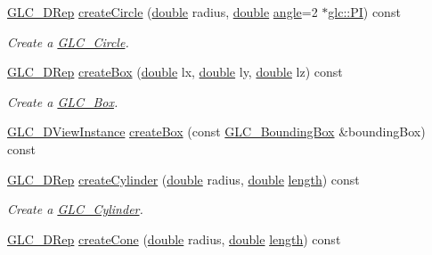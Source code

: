 \begin{DoxyCompactItemize}
\hyperlink{class_g_l_c__3_d_rep}{G\-L\-C\-\_\-D\-Rep} \hyperlink{class_g_l_c___factory_ace93470a718f80b8282987f3784ec05d}{create\-Circle} (\hyperlink{_super_l_u_support_8h_a8956b2b9f49bf918deed98379d159ca7}{double} radius, \hyperlink{_super_l_u_support_8h_a8956b2b9f49bf918deed98379d159ca7}{double} \hyperlink{glext_8h_a9e06c1f76a20fed54ca742cd25cb02c4}{angle}=2 $\ast$\hyperlink{namespaceglc_ad0f268df7555a0084f6f242e599a0572}{glc\-::\-P\-I}) const 
\begin{DoxyCompactList}\small\item\em Create a \hyperlink{class_g_l_c___circle}{G\-L\-C\-\_\-\-Circle}. \end{DoxyCompactList}\item 
\hyperlink{class_g_l_c__3_d_rep}{G\-L\-C\-\_\-D\-Rep} \hyperlink{class_g_l_c___factory_a686eeae61763938454ea889f2e21ccff}{create\-Box} (\hyperlink{_super_l_u_support_8h_a8956b2b9f49bf918deed98379d159ca7}{double} lx, \hyperlink{_super_l_u_support_8h_a8956b2b9f49bf918deed98379d159ca7}{double} ly, \hyperlink{_super_l_u_support_8h_a8956b2b9f49bf918deed98379d159ca7}{double} lz) const 
\begin{DoxyCompactList}\small\item\em Create a \hyperlink{class_g_l_c___box}{G\-L\-C\-\_\-\-Box}. \end{DoxyCompactList}\item 
\hyperlink{class_g_l_c__3_d_view_instance}{G\-L\-C\-\_\-D\-View\-Instance} \hyperlink{class_g_l_c___factory_a18619928cb8a58b644b9c80a671f494d}{create\-Box} (const \hyperlink{class_g_l_c___bounding_box}{G\-L\-C\-\_\-\-Bounding\-Box} \&bounding\-Box) const 
\item 
\hyperlink{class_g_l_c__3_d_rep}{G\-L\-C\-\_\-D\-Rep} \hyperlink{class_g_l_c___factory_a22a81a7c17d389dad39c4be8d2d1b595}{create\-Cylinder} (\hyperlink{_super_l_u_support_8h_a8956b2b9f49bf918deed98379d159ca7}{double} radius, \hyperlink{_super_l_u_support_8h_a8956b2b9f49bf918deed98379d159ca7}{double} \hyperlink{glext_8h_a3c8469415bbc83dd1341af15c67f1cef}{length}) const 
\begin{DoxyCompactList}\small\item\em Create a \hyperlink{class_g_l_c___cylinder}{G\-L\-C\-\_\-\-Cylinder}. \end{DoxyCompactList}\item 
\hyperlink{class_g_l_c__3_d_rep}{G\-L\-C\-\_\-D\-Rep} \hyperlink{class_g_l_c___factory_aa956622045f777b5bdb35ad5cf73ef4f}{create\-Cone} (\hyperlink{_super_l_u_support_8h_a8956b2b9f49bf918deed98379d159ca7}{double} radius, \hyperlink{_super_l_u_support_8h_a8956b2b9f49bf918deed98379d159ca7}{double} \hyperlink{glext_8h_a3c8469415bbc83dd1341af15c67f1cef}{length}) const 

\end{DoxyCompactItemize}
